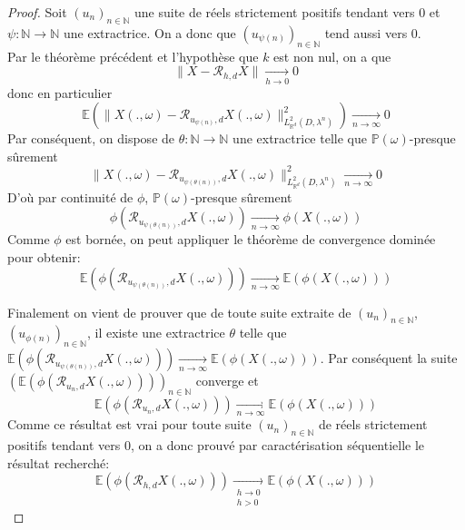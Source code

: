 \begin{proof}
  Soit $(u_n)_{n \in \mathbb{N}}$ une suite de réels strictement positifs tendant vers $0$ et
  $\psi: \mathbb{N} \rightarrow \mathbb{N}$ une extractrice. On a donc que $(u_{\psi(n)})_{n \in \mathbb{N}}$ tend aussi vers $0$.\\

  \noindent Par le théorème précédent et l'hypothèse que $k$ est non nul, on a que \begin{equation*}\|X - \mathcal{R}_{h,d}X\|  \underset{h \to 0}{\rightarrow} 0\end{equation*}
  donc en particulier \begin{equation*}\mathbb{E}(\|X(.,\omega) - \mathcal{R}_{u_{\psi(n)},d}X(.,\omega)\|_{L^2_{\mathbb{R}^d}(D,\lambda^n)}^2) \underset{n \to \infty}{\rightarrow} 0\end{equation*}
  Par conséquent, on dispose de $\theta: \mathbb{N} \rightarrow \mathbb{N}$ une extractrice telle que $\mathbb{P}(\omega)$-presque sûrement
  \begin{equation*}\|X(.,\omega) - \mathcal{R}_{u_{\psi(\theta(n))},d}X(.,\omega)\|_{L^2_{\mathbb{R}^d}(D,\lambda^n)}^2 \underset{n \to \infty}{\rightarrow} 0\end{equation*}
  \noindent D'où par continuité de $\phi$, $\mathbb{P}(\omega)$-presque sûrement
  \begin{equation*}\phi(\mathcal{R}_{u_{\psi(\theta(n))},d}X(.,\omega)) \underset{n \to \infty} {\to}\phi(X(.,\omega))\end{equation*} Comme $\phi$ est bornée, on peut appliquer le théorème de convergence dominée pour
  obtenir: \begin{equation*} \mathbb{E}(\phi(\mathcal{R}_{u_{ \psi(\theta(n)) },d}X(.,\omega))) \underset{n \to \infty}{\rightarrow}  \mathbb{E}(\phi(X(.,\omega))) \end{equation*}

  \noindent Finalement on vient de prouver que de toute suite extraite de $(u_n)_{n \in \mathbb{N}}$, $(u_{\phi(n)})_{n \in \mathbb{N}}$, il existe une extractrice $\theta$ telle
  que $\mathbb{E}(\phi(\mathcal{R}_{u_{\psi(\theta(n))},d}X(.,\omega))) \underset{n \to \infty}{\rightarrow}  \mathbb{E}(\phi(X(.,\omega)))$. Par conséquent la suite
  $(\mathbb{E}(\phi(\mathcal{R}_{u_n,d}X(.,\omega))))_{n \in \mathbb{N}}$ converge et
  \begin{equation*}
    \mathbb{E}(\phi(\mathcal{R}_{u_n,d}X(.,\omega))) \underset{n \to \infty}{\rightarrow}  \mathbb{E}(\phi(X(.,\omega)))
  \end{equation*}
  Comme ce résultat est vrai pour toute suite $(u_n)_{n \in \mathbb{N}}$ de réels strictement positifs tendant vers $0$, on a donc prouvé par caractérisation
  séquentielle le résultat recherché: \begin{equation*} \mathbb{E}(\phi(\mathcal{R}_{h,d}X(.,\omega))) \underset{\substack{h \to 0 \\ h>0}}{\rightarrow}  \mathbb{E}(\phi(X(.,\omega))) \end{equation*}
\end{proof}


